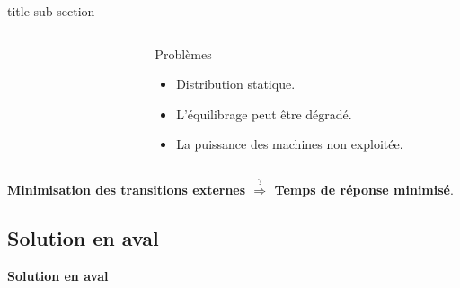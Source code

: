 \begin{frame}{title sub section}
{\begin{columns}
\begin{column}{0.3\textwidth}
\begin{figure}
\begin{tikzpicture}
					\end{tikzpicture}
				\end{figure}
			\end{column}
		
         \begin{column}{0.7\textwidth}
         	
         	\begin{block}{Problèmes}
         		\begin{itemize}
         		\item Distribution statique.%
         		\item L'équilibrage peut être dégradé.%
         		\item La puissance des machines non exploitée.%
         	 \end{itemize}
           \end{block}
         \end{column}
		\end{columns}
}
 \vspace{0.5cm}
 {
	\textbf{ Minimisation des transitions externes \color{red} $\stackrel{?}{\Rightarrow}$ Temps de réponse minimisé}.  
}
\end{frame}

\subsection{Solution en aval}
\begin{frame}
	\centering
	\vspace{2.2cm}       
	\Huge 
	\textbf{Solution en aval}
\end{frame}

